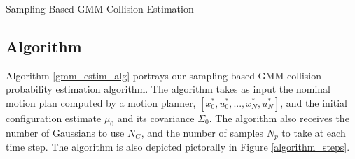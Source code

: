 \documentclass[journal]{IEEEtran}
\begin{document}
\renewcommand{\algorithmicrequire}{\textbf{Input:}}
\renewcommand{\algorithmicensure}{\textbf{Output:}}

\renewcommand{\algorithmicrequire}{\textbf{Input:}}
\renewcommand{\algorithmicensure}{\textbf{Output:}}

\begin{algorithm}
  \caption{Sampling-Based GMM Collision Estimation}
  \begin{algorithmic}[1]
     \label{samp_alg:pf}
     \label{samp_alg:initgmm}
     \label{samp_alg:weights}
    \label{samp_alg:mainforbegin}
    \label{samp_alg:control}
    \label{samp_alg:control2}
    \label{samp_alg:ekfp_1}
    \label{samp_alg:ekfp_2}
    
     \label{samp_alg:ekfp_3}
    
    \ENDFOR \label{samp_alg:ekfp_4}
     \label{samp_alg:trunc}
    
     \label{samp_alg:accumulate}
    \ENDFOR \label{samp_alg:mainforend}
    \label{samp_alg:inverse}
  \end{algorithmic}
\label{gmm_estim_alg}  
\end{algorithm}

\subsection{Algorithm}

Algorithm \ref{gmm_estim_alg} portrays our sampling-based GMM collision probability estimation algorithm. The algorithm takes as input the nominal motion plan computed by a motion planner, $[x_0^*,u_0^*,...,x_N^*,u_N^*]$, and the initial configuration estimate $\mu_0$ and its covariance $\Sigma_0$. The algorithm also receives the number of Gaussians to use $N_G$, and the number of samples $N_p$ to take at each time step. The algorithm is also depicted pictorally in Figure \ref{algorithm_steps}.
\end{document}
